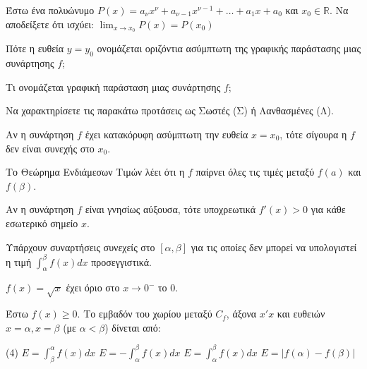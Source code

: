 \documentclass[11pt,a4paper]{article}
\newcommand{\kerkissans}[1]{{\fontfamily{maksf}\selectfont \textbf{#1}}}
\renewcommand{\textdexiakeraia}{}
\newcommand{\dint}{\displaystyle\int}
\newcommand\themanum{A}
\newcounter{thema}[section]
\renewcommand{\thethema}{\arabic{thema}}
\newcommand{\Thema}{\refstepcounter{thema}{\textbf{\textcolor{black}{\faPenSquare\ \  \large \kerkissans{\textbf{\thethemaο\hspace{2mm}Διαγώνισμα - Θέμα \themanum}}}}}\hspace{0mm}}{}
\newenvironment{thema}[1]
{\begin{tcolorbox}[title=\Thema\kerkissans{\textbf{\large{  #1}}},breakable,
enhanced standard,titlerule=0pt,toprule=0pt, rightrule=0pt, bottomrule=0pt,
colback=white,left=0mm,top=1mm,bottom=0mm,
boxrule=0pt,
colframe=white,leftrule=0mm,sharp corners,coltitle=black]
\renewcommand{\themanum}{#1}}
{\end{tcolorbox}}
\begin{document}
\begin{thema}{A}
\begin{erwthma}
    \item Έστω ένα πολυώνυμο $P(x) = a_\nu x^\nu + a_{\nu-1} x^{\nu-1} + \ldots + a_1 x + a_0$ και $ x_0 \in \mathbb{R} $. Να αποδείξετε ότι ισχύει: $ \lim_{x\to x_0} P(x) = P(x_0) $
    \item Πότε η ευθεία $y=y_0$ ονομάζεται οριζόντια ασύμπτωτη της γραφικής παράστασης μιας συνάρτησης $f$;
    \item Τι ονομάζεται γραφική παράσταση μιας συνάρτησης $f$;
    \item Να χαρακτηρίσετε τις παρακάτω προτάσεις ως Σωστές (Σ) ή Λανθασμένες (Λ).
    \begin{alist}
        \item Αν η συνάρτηση $f$ έχει κατακόρυφη ασύμπτωτη την ευθεία $x = x_0$, τότε σίγουρα η $f$ δεν είναι συνεχής στο $x_0$.
        \item Το Θεώρημα Ενδιάμεσων Τιμών λέει ότι η $f$ παίρνει όλες τις τιμές μεταξύ $f(a)$ και $f(\beta)$.
        \item Αν η συνάρτηση $f$ είναι γνησίως αύξουσα, τότε υποχρεωτικά $f'(x) > 0$ για κάθε εσωτερικό σημείο $x$.
        \item Υπάρχουν συναρτήσεις συνεχείς στο $[\alpha, \beta]$ για τις οποίες δεν μπορεί να υπολογιστεί η τιμή $\dint_{\alpha}^{\beta} f(x) dx$ προσεγγιστικά.
        \item $f(x) = \sqrt{x}$ έχει όριο στο $x \to 0^-$ το 0.
    \end{alist}
    \item Έστω $f(x) \ge 0$. Το εμβαδόν του χωρίου μεταξύ $C_f$, άξονα $x'x$ και ευθειών $x=\alpha, x=\beta$ (με $\alpha<\beta$) δίνεται από:
    \begin{tasks}[label=\let\textdexiakeraia\relax\alph*.](4)
        \task $E = \dint_\beta^\alpha f(x) dx$
        \task $E = - \dint_\alpha^\beta f(x) dx$
        \task $E = \dint_\alpha^\beta f(x) dx$
        \task $E = |f(\alpha) - f(\beta)|$
    \end{tasks}
\end{erwthma}
\end{thema}
\vspace{1cm}
\end{document}
